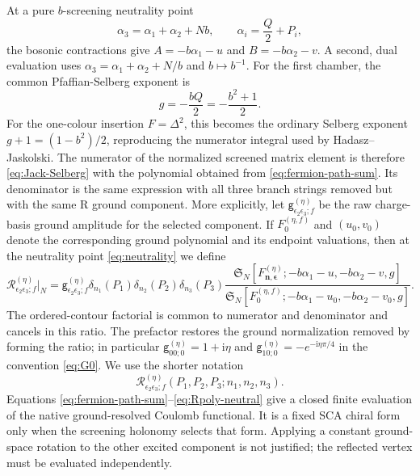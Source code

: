 \documentclass[11pt]{article}
\newcommand{\cR}{\mathcal R}
\newcommand{\eps}{\epsilon}
\newcommand{\ii}{\mathrm i}
\begin{document}
At a pure $b$-screening neutrality point
\begin{equation}
 \alpha_3=\alpha_1+\alpha_2+Nb,\qquad
 \alpha_i=\frac Q2+P_i,
 \label{eq:neutrality}
\end{equation}
the bosonic contractions give $A=-b\alpha_1-u$ and
$B=-b\alpha_2-v$.  A second, dual evaluation uses
$\alpha_3=\alpha_1+\alpha_2+N/b$ and $b\mapsto b^{-1}$.  For the first
chamber, the common Pfaffian-Selberg exponent is
\begin{equation}
 g=-\frac{bQ}{2}=-\frac{b^2+1}{2}.
 \label{eq:g}
\end{equation}
For the one-colour insertion $F=\Delta^2$, this becomes the ordinary
Selberg exponent $g+1=(1-b^2)/2$, reproducing the numerator integral used
by Hadasz--Jaskolski.
The numerator of the normalized screened matrix element is therefore
\eqref{eq:Jack-Selberg} with the polynomial obtained from
\eqref{eq:fermion-path-sum}.  Its denominator is the same expression with
all three branch strings removed but with the same R ground component.
More explicitly, let $\mathsf g_{\eps_2\eps_3;f}^{(\eta)}$ be the raw
charge-basis ground amplitude for the selected component.  If
$F_0^{(\eta,f)}$ and $(u_0,v_0)$ denote the corresponding ground polynomial
and its endpoint valuations, then at the neutrality point
\eqref{eq:neutrality} we define
\begin{equation}
 \cR_{\eps_2\eps_3;f}^{(\eta)}\big|_N
 =\mathsf g_{\eps_2\eps_3;f}^{(\eta)}
 \delta_{n_1}(P_1)\delta_{n_2}(P_2)\delta_{n_3}(P_3)
 \frac{\mathfrak S_N[F^{(\eta)}_{\boldsymbol n,\boldsymbol\eps};
 -b\alpha_1-u,-b\alpha_2-v,g]}
 {\mathfrak S_N[F_0^{(\eta,f)};
 -b\alpha_1-u_0,-b\alpha_2-v_0,g]}.
 \label{eq:Rpoly-neutral}
\end{equation}
The ordered-contour factorial is common to numerator and denominator and
cancels in this ratio.  The prefactor restores the ground normalization
removed by forming the ratio; in particular
$\mathsf g_{00;0}^{(\eta)}=1+\ii\eta$ and
$\mathsf g_{10;0}^{(\eta)}=-e^{-\ii\eta\pi/4}$ in the convention
\eqref{eq:G0}.  We use the shorter notation
\begin{equation}
 \cR_{\eps_2\eps_3;f}^{(\eta)}
 (P_1,P_2,P_3;n_1,n_2,n_3).
 \label{eq:Rpoly-def}
\end{equation}
Equations \eqref{eq:fermion-path-sum}--\eqref{eq:Rpoly-neutral} give a
closed finite evaluation of the native ground-resolved Coulomb functional.
It is a fixed SCA chiral form only when the screening holonomy selects that
form.  Applying a constant ground-space rotation to the other excited
component is not justified; the reflected vertex must be evaluated
independently.
\end{document}

